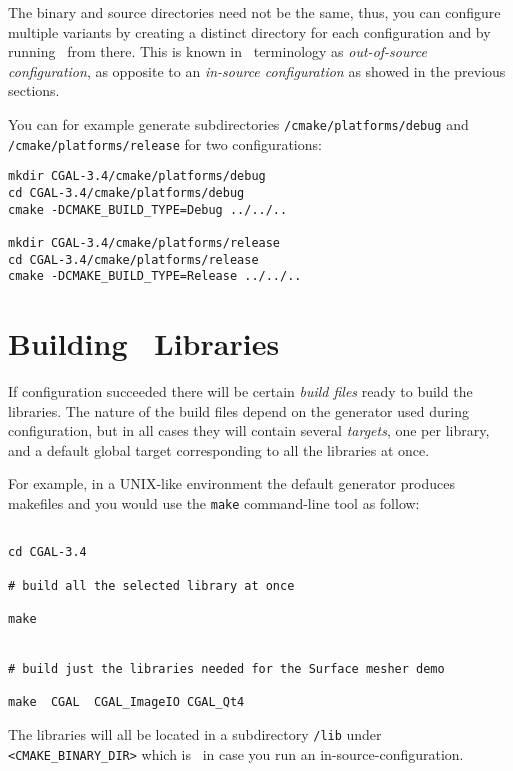 The binary and source directories need not be the same, thus, you can configure multiple variants by creating a
distinct directory for each configuration and by running \cmake\ from there. This is known in \cmake\ terminology
as  {\em out-of-source configuration}, as opposite to an {\em in-source configuration} as showed in the 
previous sections.

You can for example generate subdirectories \cgaldir{}\texttt{/cmake/platforms/debug} and 
\cgaldir{}\texttt{/cmake/platforms/release} for two configurations:

{\ccTexHtml{\scriptsize}{}
\begin{verbatim}
mkdir CGAL-3.4/cmake/platforms/debug
cd CGAL-3.4/cmake/platforms/debug
cmake -DCMAKE_BUILD_TYPE=Debug ../../..

mkdir CGAL-3.4/cmake/platforms/release
cd CGAL-3.4/cmake/platforms/release
cmake -DCMAKE_BUILD_TYPE=Release ../../..
\end{verbatim}
}

\section{Building \cgal\ Libraries}

If configuration succeeded there will be certain {\em build files} ready to build the libraries.
The nature of the build files depend on the generator used during configuration, but in all cases they 
will contain several {\em targets}, one per library,  and a default global target corresponding 
to all the libraries at once.

For example, in a UNIX-like environment the default generator produces makefiles and you would
use the \texttt{make} command-line tool as follow:

{\ccTexHtml{\scriptsize}{}
\begin{verbatim}

cd CGAL-3.4

# build all the selected library at once

make 


# build just the libraries needed for the Surface mesher demo

make  CGAL  CGAL_ImageIO CGAL_Qt4

\end{verbatim}
}

The libraries will all be located in a subdirectory {\tt /lib} under {\tt <CMAKE\_BINARY\_DIR>}
which is \cgaldir\ in case you run an in-source-configuration.

